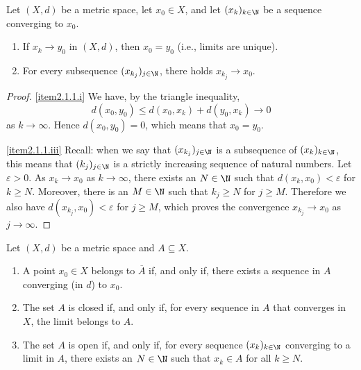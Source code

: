 \np

\begin{theorem} \label{thm:uniqueness}
Let  $(X,d)$ be a metric space, let $x_0\in X$, and let $(x_k)_{k \in \N}$ be a sequence converging to $x_0$.
\begin{enumerate}
\item \label{item2.1.1.i} If $x_k \to y_0$ in $(X,d)$, then $x_0 = y_0$ (i.e., limits are unique).
\item \label{item2.1.1.iii} For every subsequence $(x_{k_j})_{j \in \N}$, there holds
$x_{k_j} \to x_0$.
\end{enumerate}
\end{theorem}

\begin{proof}
\eqref{item2.1.1.i} We have, by the triangle inequality,
\[
d(x_0,y_0) \le d(x_0,x_k) + d(y_0,x_k) \to 0
\]
as $k \to \infty$. Hence $d(x_0,y_0) = 0$, which means that $x_0 = y_0$.

\eqref{item2.1.1.iii} Recall: when we say that $(x_{k_j})_{j \in \N}$ is a subsequence of $(x_k)_{k \in \N}$,
this means that $(k_j)_{j\in \N}$ is a strictly increasing sequence of natural numbers. Let $\varepsilon > 0$.
As $x_k \to x_0$ as $k \to \infty$, there exists an $N \in \N$ such that $d(x_k,x_0) < \varepsilon$ for $k \ge N$.
Moreover, there is an $M \in \N$ such that $k_j \ge N$ for $j \ge M$. Therefore we also have $d(x_{k_j},x_0) < \varepsilon$
for $j \ge M$, which proves the convergence $x_{k_j} \to x_0$ as $j \to \infty$.
\end{proof}

\begin{theorem} \label{thm:limit_closed}
Let $(X,d)$ be a metric space and $A \subseteq X$.
\begin{enumerate}
\item \label{item2.1.2.i} A point $x_0 \in X$ belongs to $\overline{A}$ if,
and only if, there exists a sequence in $A$ converging (in $d$) to $x_0$.
\item \label{item2.1.2.ii} The set $A$ is closed if, and only if, for every sequence
in $A$ that converges in $X$, the limit belongs to $A$.
\item \label{item2.1.2.iii} The set $A$ is open if, and only if, for
every sequence $(x_k)_{k \in \N}$  converging to a limit in $A$,
there exists an $N \in \N$ such that $x_k \in A$ for all $k \ge N$.
\end{enumerate}
\end{theorem}

